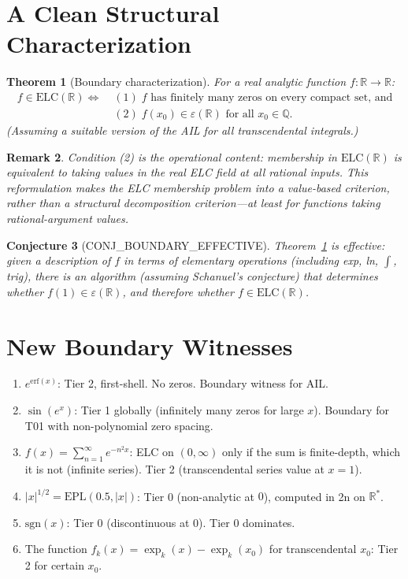\documentclass[11pt]{article}
\newtheorem{theorem}{Theorem}
\newtheorem{remark}[theorem]{Remark}
\newtheorem{conjecture}[theorem]{Conjecture}
\begin{document}
\section{A Clean Structural Characterization}

\begin{theorem}[Boundary characterization]
\label{thm:char}
For a real analytic function $f:\mathbb{R}\to\mathbb{R}$:
\begin{align*}
f\in\mathrm{ELC}(\mathbb{R}) \iff &\; (1)\; f \text{ has finitely many zeros on every compact set, and}\\
                                   &\; (2)\; f(x_0)\in\varepsilon(\mathbb{R}) \text{ for all } x_0\in\mathbb{Q}.
\end{align*}
(Assuming a suitable version of the AIL for all transcendental integrals.)
\end{theorem}

\begin{remark}
Condition (2) is the operational content: membership in $\mathrm{ELC}(\mathbb{R})$
is equivalent to taking values in the real ELC field at all rational inputs.
This reformulation makes the ELC membership problem into a \emph{value-based} criterion,
rather than a structural decomposition criterion---at least for functions taking rational-argument values.
\end{remark}

\begin{conjecture}[CONJ\_BOUNDARY\_EFFECTIVE]
Theorem~\ref{thm:char} is effective: given a description of $f$ in terms of elementary
operations (including exp, ln, $\int$, trig), there is an algorithm (assuming Schanuel's conjecture)
that determines whether $f(1)\in\varepsilon(\mathbb{R})$, and therefore whether $f\in\mathrm{ELC}(\mathbb{R})$.
\end{conjecture}

\section{New Boundary Witnesses}

\begin{enumerate}
  \item $e^{\mathrm{erf}(x)}$: Tier 2, first-shell. No zeros. Boundary witness for AIL.
  \item $\sin(e^x)$: Tier 1 globally (infinitely many zeros for large $x$). Boundary for T01 with non-polynomial zero spacing.
  \item $f(x)=\sum_{n=1}^\infty e^{-n^2 x}$: ELC on $(0,\infty)$ only if the sum is finite-depth,
    which it is not (infinite series). Tier 2 (transcendental series value at $x=1$).
  \item $|x|^{1/2}=\mathrm{EPL}(0.5,|x|)$: Tier 0 (non-analytic at $0$), computed in 2n on $\mathbb{R}^*$.
  \item $\mathrm{sgn}(x)$: Tier 0 (discontinuous at $0$). Tier 0 dominates.
  \item The function $f_k(x)=\exp_k(x)-\exp_k(x_0)$ for transcendental $x_0$: Tier 2 for certain $x_0$.
\end{enumerate}
\end{document}
